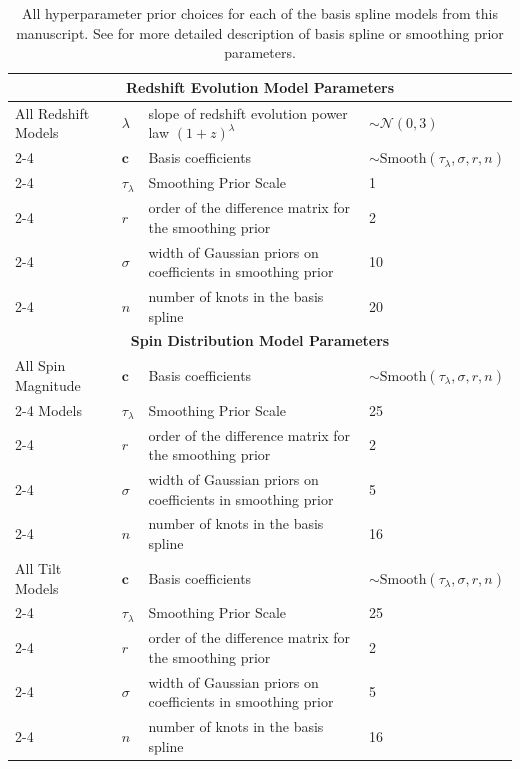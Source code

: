 \begin{table}[h!]
\begin{tabular}{|l|l|l|l|}
    \multicolumn{4}{|c|}{\textbf{Redshift Evolution Model Parameters}} \\ \hline
    All Redshift Models & $\lambda$ & slope of redshift evolution power law $(1+z)^\lambda$ &  $\sim \mathcal{N}(0,3)$ \\ \cline{2-4}
    & $\bm{c}$ & Basis coefficients & $\sim \mathrm{Smooth}(\tau_\lambda, \sigma, r, n)$ \\ \cline{2-4} 
     & $\tau_\lambda$ & Smoothing Prior Scale & 1 \\ \cline{2-4}
     & $r$ & order of the difference matrix for the smoothing prior & 2 \\ \cline{2-4} 
     & $\sigma$ & width of Gaussian priors on coefficients in smoothing prior & 10 \\ \cline{2-4} 
     & $n$ & number of knots in the basis spline & 20 \\ \hline \hline 



    \multicolumn{4}{|c|}{\textbf{Spin Distribution Model Parameters}} \\ \hline
    All Spin Magnitude & $\bm{c}$ &  Basis coefficients & $\sim \mathrm{Smooth}(\tau_\lambda, \sigma, r, n)$  \\ \cline{2-4} 
    Models & $\tau_\lambda$ & Smoothing Prior Scale & 25\\ \cline{2-4}
    & $r$ & order of the difference matrix for the smoothing prior & 2 \\ \cline{2-4} 
    & $\sigma$ & width of Gaussian priors on coefficients in smoothing prior & 5 \\ \cline{2-4} 
    & $n$ & number of knots in the basis spline & 16 \\ \hline \hline 


    All Tilt Models & $\bm{c}$ &  Basis coefficients & $\sim \mathrm{Smooth}(\tau_\lambda, \sigma, r, n)$  \\ \cline{2-4} 
    & $\tau_\lambda$ & Smoothing Prior Scale & 25 \\ \cline{2-4}
    & $r$ & order of the difference matrix for the smoothing prior & 2 \\ \cline{2-4} 
    & $\sigma$ & width of Gaussian priors on coefficients in smoothing prior & 5 \\ \cline{2-4} 
    & $n$ & number of knots in the basis spline & 16 \\ \hline \hline
    \end{tabular}
    \caption{All hyperparameter prior choices for each of the basis spline models from this manuscript. See \brucepaper{} for more detailed description of basis spline or smoothing prior parameters.}
    \label{tab:model_priors}
\end{table} 


